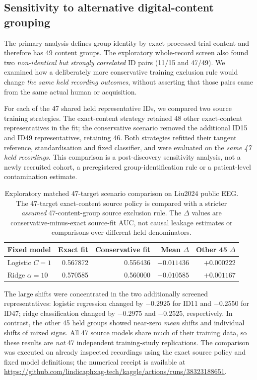 \subsection{Sensitivity to alternative digital-content grouping}
\label{sec:p2-similarity-group-sensitivity}
The primary analysis defines group identity by exact processed trial
content and therefore has 49 content groups. The exploratory
whole-record screen also found two \emph{non-identical but strongly
correlated} ID pairs (11/15 and 47/49). We examined how a deliberately
more conservative training exclusion rule would change
\emph{the same held recording outcomes}, without asserting that
those pairs came from the same actual human or acquisition.

For each of the 47 shared held representative IDs, we compared
two source training strategies. The exact-content strategy
retained 48 other exact-content representatives in the fit;
the conservative scenario removed the additional ID15 and ID49
representatives, retaining 46. Both strategies refitted their
tangent reference, standardisation and fixed classifier,
and were evaluated on the \emph{same 47 held recordings}.
This comparison is a post-discovery sensitivity analysis, not
a newly recruited cohort, a preregistered group-identification
rule or a patient-level contamination estimate.

\begin{table}[tb]
\centering\small
\caption{Exploratory matched 47-target scenario comparison on
Liu2024 public EEG. The 47-target exact-content source policy
is compared with a stricter \emph{assumed} 47-content-group
source exclusion rule. The \(\Delta\) values are
conservative-minus-exact source-fit AUC, not causal leakage
estimates or comparisons over different held denominators.}
\label{tab:p2-near47-sensitivity}
\setlength{\tabcolsep}{3.5pt}
\begin{tabular}{lrrrr}
\toprule
Fixed model & Exact fit & Conservative fit & Mean $\Delta$ & Other 45 $\Delta$\\
\midrule
Logistic $C{=}1$ & 0.567872 & 0.556436 & $-0.011436$ & $+0.000222$\\
Ridge $\alpha{=}10$ & 0.570585 & 0.560000 & $-0.010585$ & $+0.001167$\\
\bottomrule
\end{tabular}
\end{table}

The large shifts were concentrated in the two additionally
screened representatives: logistic regression changed by
$-0.2925$ for ID11 and $-0.2550$ for ID47; ridge
classification changed by $-0.2975$ and $-0.2525$,
respectively. In contrast, the other 45 held groups
showed near-zero \emph{mean} shifts and individual shifts
of mixed signs. All 47 source models share much of their
training data, so these results are \emph{not} 47
independent training-study replications.
The comparison was executed on already inspected recordings
using the exact source policy and fixed model definitions;
the numerical receipt is available at
\url{https://github.com/lindicaphxag-tech/kaggle/actions/runs/38323188651}.

